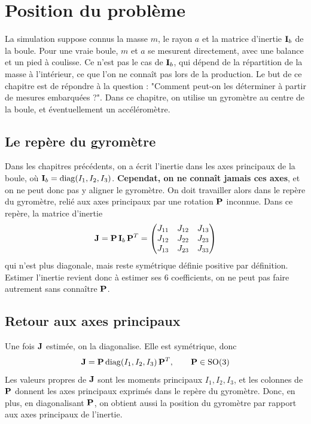 
\section{Position du problème}

La simulation suppose connus la masse $m$, le rayon $a$ et la matrice
d'inertie $\mathbf{I}_b$ de la boule. Pour une vraie boule, $m$ et $a$ se
mesurent directement, avec une balance et un pied à coulisse. Ce n'est
pas le cas de $\mathbf{I}_b$, qui dépend de la répartition de la masse à
l'intérieur, ce que l'on ne connaît pas lors de la production. Le but de ce chapitre est de répondre à la question : "Comment peut-on les déterminer à partir de mesures embarquées ?". Dans ce chapitre, on utilise un gyromètre au centre de la boule, et éventuellement un accéléromètre.

\subsection{Le repère du gyromètre}

Dans les chapitres précédents, on a écrit l'inertie dans les axes
principaux de la boule, où $\mathbf{I}_b = \mathrm{diag}(I_1, I_2, I_3)$.
\textbf{Cependat, on ne connaît jamais ces axes}, et on ne peut donc pas y aligner le gyromètre. On doit travailler alors dans le repère du gyromètre, relié aux axes principaux par une rotation $\mathbf{P}$ inconnue. Dans ce repère, la matrice d'inertie
\[
    \mathbf{J} = \mathbf{P}\,\mathbf{I}_b\,\mathbf{P}^T
    = \begin{pmatrix}
        J_{11} & J_{12} & J_{13}\\
        J_{12} & J_{22} & J_{23}\\
        J_{13} & J_{23} & J_{33}
    \end{pmatrix}
\]
qui n'est plus diagonale, mais reste symétrique définie positive par définition. Estimer l'inertie revient donc à estimer ses $6$ coefficients, on ne peut pas faire autrement sans connaître $\mathbf{P}$.

\subsection{Retour aux axes principaux}

Une fois $\mathbf{J}$ estimée, on la diagonalise. Elle est symétrique,
donc
\[
    \mathbf{J} = \mathbf{P}\,\mathrm{diag}(I_1, I_2, I_3)\,\mathbf{P}^T,
    \qquad \mathbf{P} \in \mathrm{SO}(3)
\]
Les valeurs propres de $\mathbf{J}$ sont les moments principaux
$I_1, I_2, I_3$, et les colonnes de $\mathbf{P}$ donnent les axes
principaux exprimés dans le repère du gyromètre. Donc, en plus, en diagonalisant $\mathbf{P}$, on obtient aussi la position du gyromètre par rapport aux axes principaux de l'inertie.


